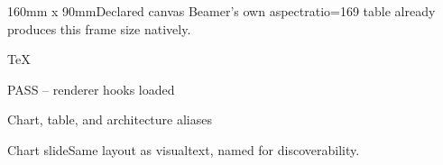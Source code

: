 \begin{frame}
\begin{comparison}
\end{comparison}
\end{frame}

\begin{frame}
\begin{threepart}
\end{threepart}
\end{frame}

\begin{frame}
\begin{herometric}{160mm x 90mm}{Declared canvas}
Beamer's own aspectratio=169 table already produces this frame size natively.
\end{herometric}
\end{frame}

\begin{frame}[fragile]
\begin{codeblock}{TeX}
\RequirePackage{reportkit-slides-core}
\RKAssertRendererHooks
\end{codeblock}
\begin{outputblock}
PASS -- renderer hooks loaded
\end{outputblock}
\end{frame}

\begin{frame}[plain]
\begin{appendixdivider}{Chart, table, and architecture aliases}
\end{appendixdivider}
\end{frame}

\begin{frame}
\begin{chartslide}[left]{Chart slide}{Same layout as visualtext, named for
discoverability.}
\begin{diagram}[
  type=matrix,
  caption={Illustrative placement.},
  description={A 2x2 matrix.}
]
\end{diagram}
\end{chartslide}
\end{frame}

